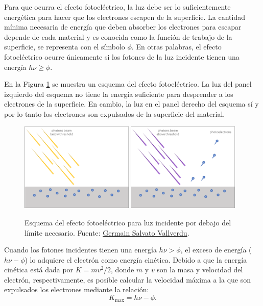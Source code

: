 Para que ocurra el efecto fotoeléctrico, la luz debe ser lo suficientemente energética para hacer que los electrones escapen de la superficie. La cantidad mínima necesaria de energía que deben absorber los electrones para escapar depende de cada material y es conocida como la función de trabajo de la superficie, se representa con el símbolo $ \phi $. En otras palabras, el efecto fotoeléctrico ocurre únicamente si los fotones de la luz incidente tienen una energía $ h\nu \geq \phi $.

En la Figura \ref{fig:photo-effect} se muestra un esquema del efecto fotoeléctrico. La luz del panel izquierdo del esquema no tiene la energía suficiente para desprender a los electrones de la superficie. En cambio, la luz en el panel derecho del esquema sí y por lo tanto los electrones son expulsados de la superficie del material.  

\begin{figure}[htb]
  \centering
				\includegraphics[width=0.48\textwidth]{figures/below2.png}
				\includegraphics[width=0.48\textwidth]{figures/above2.png}
				\caption{Esquema del efecto fotoeléctrico para luz incidente por debajo del límite necesario. Fuente: \href{https://gsalvatovallverdu.gitlab.io/post/2017-01-09-photoelectric-effect-gif/}{Germain Salvato Vallverdu}.}
				\label{fig:photo-effect} 
\end{figure}

Cuando los fotones incidentes tienen una energía $ h\nu > \phi $, el exceso de energía ($ h\nu - \phi $) lo adquiere el electrón como energía cinética. Debido a que la energía cinética está dada por $ K = mv^2/2 $, donde $ m $ y $ v $ son la masa y velocidad del electrón, respectivamente, es posible calcular la velocidad máxima a la que son expulsados los electrones mediante la relación:
\[ K_{\max} = h\nu - \phi. \]

